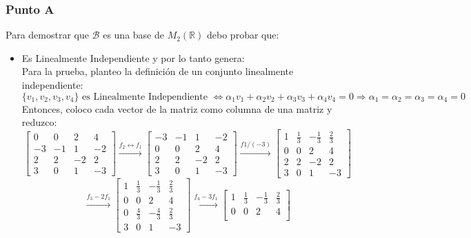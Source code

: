 \documentclass[a4paper,12pt]{article}
\begin{document}
\subsubsection{Punto A}
Para demostrar que $\mathcal{B}$ es una base de $M_2(\mathds{R})$ debo probar que:
\begin{itemize}
    \item Es Linealmente Independiente y por lo tanto genera: \\
    Para la prueba, planteo la definición de un conjunto linealmente independiente:
    $$
    \{ v_1, v_2, v_3, v_4 \} \text{ es Linealmente Independiente } \Leftrightarrow \alpha_1v_1+\alpha_2v_2+\alpha_3v_3+\alpha_4v_4=0 \Rightarrow \alpha_1=\alpha_2=\alpha_3=\alpha_4=0
    $$
    Entonces, coloco cada vector de la matriz como columna de una matriz y reduzco:
    $$
    \begin{bmatrix}
        0 & 0 & 2 & 4 \\
        -3 & -1 & 1 & -2 \\
        2 & 2 & -2 & 2 \\
        3 & 0 & 1 & -3
    \end{bmatrix}
    \xrightarrow[]{f_2\leftrightarrow f_1}
    \begin{bmatrix}
        -3 & -1 & 1 & -2 \\
        0 & 0 & 2 & 4 \\
        2 & 2 & -2 & 2 \\
        3 & 0 & 1 & -3
    \end{bmatrix}
    \xrightarrow[]{f1/(-3)}
    \begin{bmatrix}
        1 & \frac{1}{3} & -\frac{1}{3} & \frac{2}{3} \\
        0 & 0 & 2 & 4 \\
        2 & 2 & -2 & 2 \\
        3 & 0 & 1 & -3
    \end{bmatrix}
    $$
    $$
    \xrightarrow[]{f_3-2f_1}
    \begin{bmatrix}
        1 & \frac{1}{3} & -\frac{1}{3} & \frac{2}{3} \\
        0 & 0 & 2 & 4 \\
        0 & \frac{4}{3} & -\frac{4}{3} & \frac{2}{3} \\
        3 & 0 & 1 & -3
    \end{bmatrix}
    \xrightarrow[]{f_4-3f_1}
    \begin{bmatrix}
        1 & \frac{1}{3} & -\frac{1}{3} & \frac{2}{3} \\
        0 & 0 & 2 & 4 \\

\end{bmatrix}$$
\end{itemize}
\end{document}
